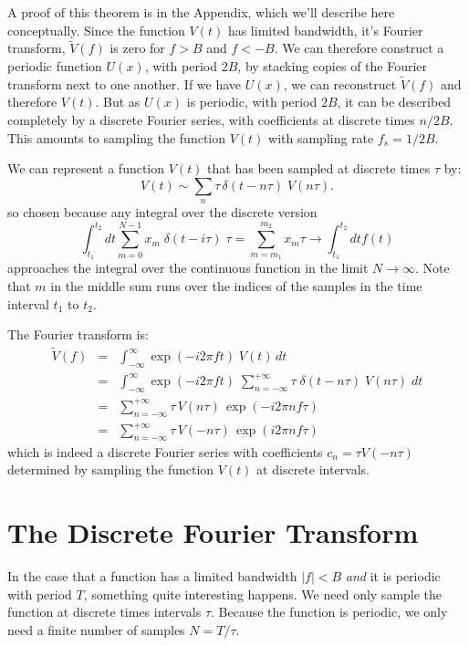 \documentclass[12pt,oneside]{book}
\begin{document}
A proof of this theorem is in the Appendix, which we'll describe here conceptually.  Since the function $V(t)$ has limited bandwidth, it's Fourier transform, $\widetilde{V}(f)$ is zero for $f > B$ and $f < -B$.  We can therefore construct a periodic function $U(x)$, with period $2B$, by stacking copies of the Fourier transform next to one another.  If we have $U(x)$, we can reconstruct $\widetilde{V}(f)$ and therefore $V(t)$.  But as $U(x)$ is periodic, with period $2B$, it can be described completely by a discrete Fourier series, with coefficients at discrete times $n / 2B$.  This amounts to sampling the function $V(t)$ with sampling rate $f_s = 1 / 2B$.

We can represent a function $V(t)$ that has been sampled at discrete times $\tau$ by:
\begin{displaymath}
V(t) \sim \sum_n \tau \, \delta(t-n\tau) \; V(n\tau).
\end{displaymath}
so chosen because any integral over the discrete version
\begin{displaymath}
\int_{t_1}^{t_2} dt \sum_{m=0}^{N-1} x_m \; \delta(t - i\tau) \; \tau = \sum_{m=m_1}^{m_2} x_m  \tau
\to \int_{t_1}^{t_2} dt f(t)  
\end{displaymath}
approaches the integral over the continuous function in the limit $N \to \infty$.  Note that $m$ in the middle sum runs over the indices of the samples in the time interval $t_1$ to $t_2$.

The Fourier transform is:
\begin{eqnarray*}
\widetilde{V}(f) &=& \int^{\infty}_{-\infty}\exp(-i2\pi f t) \; V(t) \, dt \\
&=& \int^{\infty}_{-\infty}\exp(-i2\pi f t) \;  \sum_{n=-\infty}^{+\infty} \tau \; \delta(t-n\tau) \; V(n\tau) \; dt \\
&=& \sum_{n=-\infty}^{+\infty} \tau \, V(n\tau) \, \exp(-i2\pi n f \tau ) \\
&=& \sum_{n=-\infty}^{+\infty} \tau \, V(-n\tau) \, \exp(i2\pi n f \tau )
\end{eqnarray*}
which is indeed a discrete Fourier series with coefficients $c_n = \tau V(-n \tau)$ determined by sampling the function $V(t)$ at discrete intervals.

\section{The Discrete Fourier Transform}

In the case that a function has a limited bandwidth $|f| < B$ {\em and} it is periodic with period $T$, something quite interesting happens.  We need only sample the function at discrete times intervals $\tau$.  Because the function is periodic, we only need a finite number of samples $N = T/\tau$.
\end{document}
